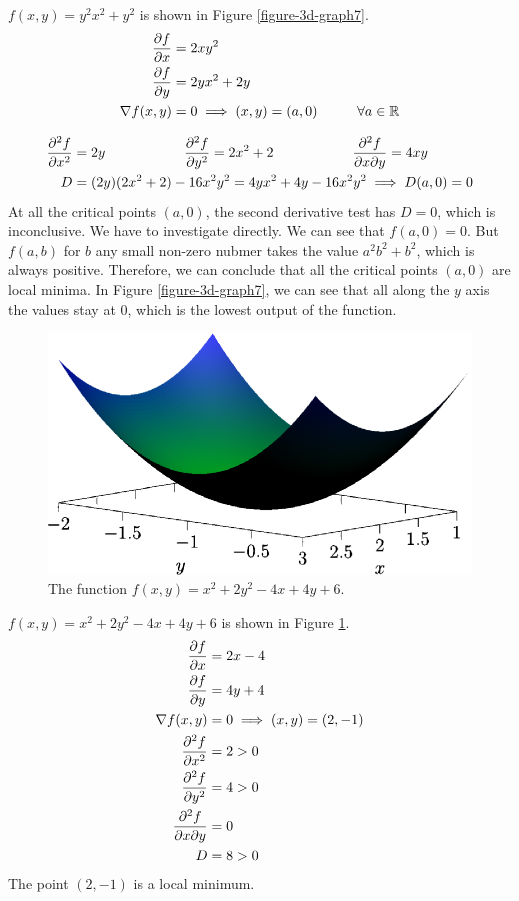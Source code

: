 \documentclass[fleqn,letterpaper]{report}
\begin{document}
\begin{example}
$f(x,y) = y^2 x^2 + y^2$ is shown in Figure \ref{figure-3d-graph7}.
\begin{align*}
\frac{\partial f}{\partial x} & = 2xy^2 \\
\frac{\partial f}{\partial y} & = 2yx^2 + 2y \\
\nabla f(x,y) & = 0 \implies (x,y) = (a,0) \hspace{1cm}
\forall a \in \mathbb{R} 
\end{align*}

\begin{align*}
\frac{\partial^2 f}{\partial x^2} & = 2y \hspace{2cm}
\frac{\partial^2 f}{\partial y^2} = 2x^2 + 2 \hspace{2cm}
\frac{\partial^2 f}{\partial x \partial y} = 4xy \\
D & = (2y)(2x^2+ 2) - 16x^2 y^2 = 4yx^2 + 4y - 16x^2 y^2
\implies D(a,0) = 0
\end{align*}
At all the critical points $(a,0)$, the second derivative test
has $D=0$, which is inconclusive. We have to investigate
directly. We can see that $f(a,0) = 0$. But $f(a,b)$ for $b$
any small non-zero nubmer takes the value $a^2 b^2 + b^2$,
which is always positive. Therefore, we can conclude that all
the critical points $(a,0)$ are local minima. In Figure
\ref{figure-3d-graph7}, we can see that all along the $y$ axis the
values stay at $0$, which is the lowest output of the
function.
\end{example}

\begin{figure}[t]
\centering
\includegraphics[width=12cm]{figure46.eps}
\caption{The function $f(x,y) = x^2+2y^2 - 4x + 4y + 6$.}
\label{figure-3d-graph8}
\end{figure}

\begin{example}
$f(x,y) = x^2 + 2y^2 - 4x + 4y + 6$ is shown in Figure
\ref{figure-3d-graph8}. 
\begin{align*}
\frac{\partial f}{\partial x} & = 2x-4 \\
\frac{\partial f}{\partial y} & = 4y+4 \\
\nabla f(x,y) & = 0 \implies (x,y) = (2,-1) \\
\frac{\partial^2 f}{\partial x^2} & = 2 > 0 \\
\frac{\partial^2 f}{\partial y^2} & = 4 > 0 \\
\frac{\partial^2 f}{\partial x \partial y} & = 0 \\
D & = 8 > 0 
\end{align*}
The point $(2,-1)$ is a local minimum.
\end{example}
\end{document}
